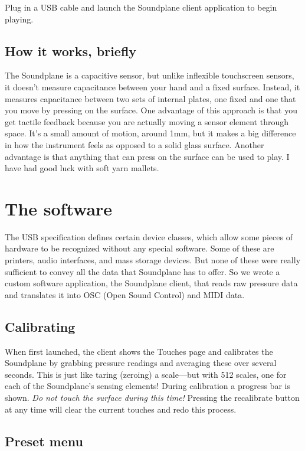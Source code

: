 Plug in a USB cable and launch the Soundplane client application to begin playing.  

\section{How it works, briefly}

The Soundplane is a capacitive sensor, but unlike inflexible touchscreen sensors, it doesn't measure capacitance between your hand and a fixed surface.  Instead, it measures capacitance between two sets of internal plates, one fixed and one that you move by pressing on the surface.  One advantage of this approach is that you get tactile feedback because you are actually moving a sensor element through space.  It's a small amount of motion, around 1mm, but it makes a big difference in how the instrument feels as opposed to a solid glass surface.  Another advantage is that anything that can press on the surface can be used to play.  I have had good luck with soft yarn mallets. 

\chapter{The software}

The USB specification defines certain device classes, which allow some pieces of hardware to be recognized without any special software.  Some of these are printers, audio interfaces, and mass storage devices.  But none of these were really sufficient to convey all the data that Soundplane has to offer.  So we wrote a custom software application, the Soundplane client, that reads raw pressure data and translates it into OSC (Open Sound Control) and MIDI data.   

\section{Calibrating}

When first launched, the client shows the Touches page and calibrates the Soundplane by grabbing pressure readings and averaging these over several seconds.  This is just like taring (zeroing) a scale—but with 512 scales, one for each of the Soundplane’s sensing elements!  During calibration a progress bar is shown.  \emph{Do not touch the surface during this time!}  Pressing the recalibrate button at any time will clear the current touches and redo this process. 

\section{Preset menu}

